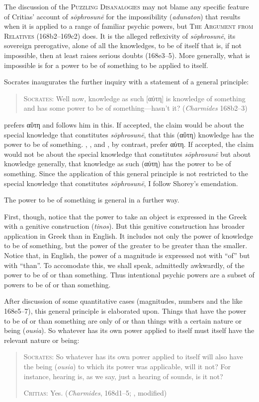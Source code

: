 The discussion of the \textsc{Puzzling Disanalogies} may not blame any specific feature of Critias' account of \emph{sōphrosunē} for the impossibility (\emph{adunaton}) that results when it is applied to a range of familiar psychic powers, but \textsc{The Argument from Relatives} (168b2–169c2) does. It is the alleged reflexivity of \emph{sōphrosunē}, its sovereign prerogative, alone of all the knowledges, to be of itself that is, if not impossible, then at least raises serious doubts (168e3–5). More generally, what is impossible is for a power to be of something to be applied to itself.

Socrates inaugurates the further inquiry with a statement of a general principle:
\begin{quote}
	\textsc{Socrates}: Well now, knowledge as such [{\sbl αὐτη}] is knowledge of something and has some power to be of something—hasn't it? (\emph{Charmides} 168b2–3)
\end{quote}
\citet{Burnet:1903aa} prefers {\sbl αὒτη} and \citet[60]{Lamb:1927qw} follows him in this. If accepted, the claim would be about the special knowledge that constitutes \emph{sōphrosunē}, that this ({\sbl αὒτη}) knowledge has the power to be of something. \citet{Shorey:1907ys}, \citet[55]{Ben:1985aa}, and \citet[220 n23]{Tuozzo:2011aa}, by contrast, prefer {\sbl αὐτη}. If accepted, the claim would not be about the special knowledge that constitutes \emph{sōphrosunē} but about knowledge generally, that knowledge as such ({\sbl αὐτη}) has the power to be of something. Since the application of this general principle is not restricted to the special knowledge that constitutes \emph{sōphrosunē}, I follow Shorey's emendation.

The power to be of something is general in a further way.

First, though, notice that the power to take an object is expressed in the Greek with a genitive construction (\emph{tinos}). But this genitive construction has broader application in Greek than in English. It includes not only the power of knowledge to be of something, but the power of the greater to be greater than the smaller. Notice that, in English, the power of a magnitude is expressed not with ``of'' but with ``than''. To accomodate this, we shall speak, admittedly awkwardly, of the power to be of or than something. Thus intentional psychic powers are a subset of powers to be of or than something.

After discussion of some quantitative cases (magnitudes, numbers and the like 168e5–7), this general principle is elaborated upon. Things that have the power to be of or than something are only of or than things with a certain nature or being (\emph{ousia}). So whatever has its own power applied to itself must itself have the relevant nature or being:
\begin{quotation}
	\textsc{Socrates}: So whatever has its own power applied to itself will also have the being (\emph{ousia}) to which its power was applicable, will it not? For instance, hearing is, as we say, just a hearing of sounds, is it not?
	
	\textsc{Critias}: Yes. (\emph{Charmides}, 168d1–5; \citealt[63]{Lamb:1927qw}, modified)
\end{quotation}

